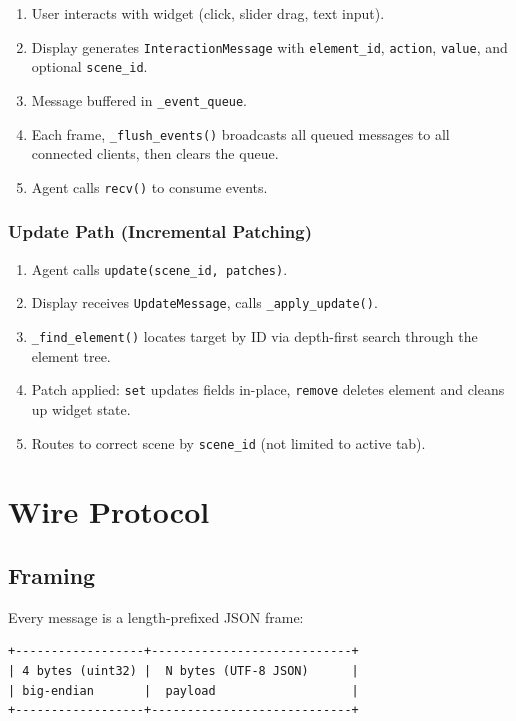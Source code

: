 \documentclass[a4paper,10pt]{article}
\newcommand{\tool}[1]{\texttt{#1}}
\newcommand{\msg}[1]{\texttt{#1}}
\newcommand{\field}[1]{\texttt{#1}}
\begin{document}
\begin{enumerate}
  \item User interacts with widget (click, slider drag, text input).
  \item Display generates \msg{InteractionMessage} with
    \field{element\_id}, \field{action}, \field{value}, and
    optional \field{scene\_id}.
  \item Message buffered in \texttt{\_event\_queue}.
  \item Each frame, \texttt{\_flush\_events()} broadcasts all queued
    messages to all connected clients, then clears the queue.
  \item Agent calls \tool{recv()} to consume events.
\end{enumerate}

\subsubsection{Update Path (Incremental Patching)}

\begin{enumerate}
  \item Agent calls \tool{update(scene\_id, patches)}.
  \item Display receives \msg{UpdateMessage}, calls
    \texttt{\_apply\_update()}.
  \item \texttt{\_find\_element()} locates target by ID via
    depth-first search through the element tree.
  \item Patch applied: \field{set} updates fields in-place,
    \field{remove} deletes element and cleans up widget state.
  \item Routes to correct scene by \field{scene\_id} (not limited
    to active tab).
\end{enumerate}

\section{Wire Protocol}

\subsection{Framing}

Every message is a length-prefixed JSON frame:

\begin{lstlisting}
+------------------+----------------------------+
| 4 bytes (uint32) |  N bytes (UTF-8 JSON)      |
| big-endian       |  payload                   |
+------------------+----------------------------+
\end{lstlisting}
\end{document}
